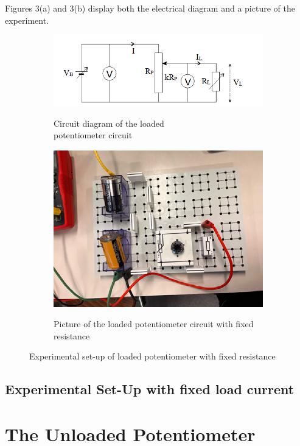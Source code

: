 \documentclass[a4paper]{article}
\begin{document}
Figures 3(a) and 3(b) display both the electrical diagram and a picture of the
experiment.
\begin{figure}[!ht]
    \centering
    \begin{subfigure}{0.5\textwidth}
        \centering
        \includegraphics[width = \linewidth]{loaded pot fixed circuit.png}
        \label{fig:3a}
        \caption{Circuit diagram of the loaded \\potentiometer circuit}
    \end{subfigure}%
    \begin{subfigure}{0.5\textwidth}
        \centering
        \includegraphics[width = 0.8\linewidth]{loaded pot fixed pic.png}
        \label{fig:3b}
        \caption{Picture of the loaded potentiometer circuit with fixed resistance}        
    \end{subfigure}
    \caption{Experimental set-up of loaded potentiometer with fixed resistance}
\end{figure}
\subsection{Experimental Set-Up with fixed load current}
\section{The Unloaded Potentiometer}
\end{document}
